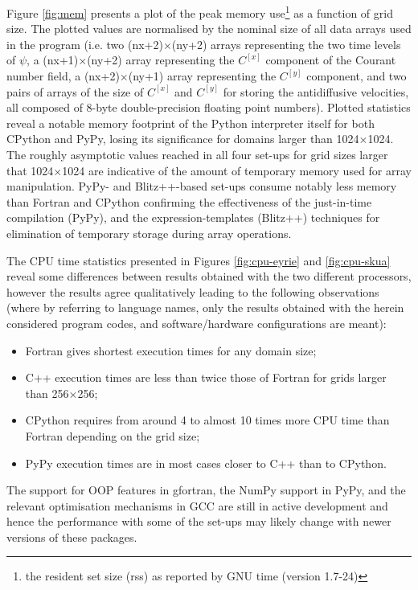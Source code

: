 \documentclass[final,5p,times,twocolumn]{elsarticle}
\begin{document}
  Figure \ref{fig:mem} presents a plot of the peak memory use\footnote{the resident set size (rss)
    as reported by GNU time (version 1.7-24)} as a function of grid size.
  The plotted values are normalised by the nominal size of all data arrays used in the program
    (i.e. two (nx+2)$\times$(ny+2) arrays representing the two time levels of $\psi$, 
     a (nx+1)$\times$(ny+2) array representing the $C^{[x]}$ component of the Courant number field,
     a (nx+2)$\times$(ny+1) array representing the $C^{[y]}$ component, 
     and two pairs of arrays of the size of $C^{[x]}$ and $C^{[y]}$ for storing the 
     antidiffusive velocities, all composed of 8-byte double-precision floating point numbers).
  Plotted statistics reveal a notable memory footprint of the Python interpreter itself
    for both CPython and PyPy, losing its significance for domains larger than 1024$\times$1024.
  The roughly asymptotic values reached in all four set-ups for grid sizes larger that 1024$\times$1024
    are indicative of the amount of temporary memory used for array manipulation.
  PyPy- and Blitz++-based set-ups consume notably less memory than Fortran and CPython confirming 
    the effectiveness of the just-in-time compilation (PyPy), and the expression-templates (Blitz++) techniques
    for elimination of temporary storage during array operations.

  The CPU time statistics presented in Figures \ref{fig:cpu-eyrie} and \ref{fig:cpu-skua} reveal
    some differences between results obtained with the two different processors,
    however the results agree qualitatively leading to the following observations
    (where by referring to language names, only the results obtained with the herein considered
     program codes, and software/hardware configurations are meant):
  \begin{itemize}
    \item{Fortran gives shortest execution times for any domain size;}
    \item{C++ execution times are less than twice those of Fortran for grids larger than 
      256$\times$256;}
    \item{CPython requires from around 4 to almost 10 times more CPU time than Fortran depending on the grid size;}
    \item{PyPy execution times are in most cases closer to C++ than to CPython.}
  \end{itemize}
  The support for OOP features in gfortran, the NumPy support in PyPy, and the relevant optimisation
    mechanisms in GCC are still in active development and hence the performance with some of the set-ups may 
    likely change with newer versions of these packages. 
\end{document}
